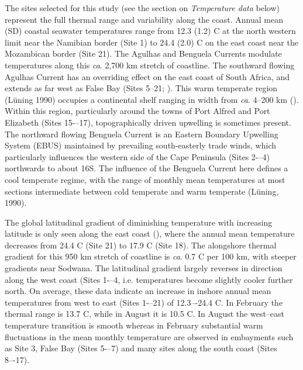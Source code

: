 \documentclass[a4paper,10pt,review]{elsarticle}
\begin{document}
The sites selected for this study (see the section on \emph{Temperature data} below) represent the full thermal range and variability along the coast. Annual mean (SD) coastal seawater temperatures range from 12.3 (1.2) \degree C at the north western limit near the Namibian border (Site 1) to 24.4 (2.0) \degree C on the east coast near the Mozambican border (Site 21). The Agulhas and Benguela Currents modulate temperatures along this \emph{ca}. 2,700 km stretch of coastline. The southward flowing Agulhas Current has an overriding effect on the east coast of South Africa, and extends as far west as False Bay (Sites 5--21; ). This warm temperate region (Lüning 1990) occupies a continental shelf ranging in width from \emph{ca}. 4--200 km (). Within this region, particularly around the towns of Port Alfred and Port Elizabeth (Sites 15-–17), topographically driven upwelling is sometimes present. The northward flowing Benguela Current is an Eastern Boundary Upwelling System (EBUS) maintained by prevailing south-easterly trade winds, which particularly influences the western side of the Cape Peninsula (Sites 2-–4) northwards to about 16\degree S. The inﬂuence of the Benguela Current here deﬁnes a cool temperate regime, with the range of monthly mean temperatures at most sections intermediate between cold temperate and warm temperate (Lüning, 1990).

The global latitudinal gradient of diminishing temperature with increasing latitude is only seen along the east coast (), where the annual mean temperature decreases from 24.4 \degree C (Site 21) to 17.9 \degree C (Site 18). The alongshore thermal gradient for this 950 km stretch of coastline is \emph{ca}. 0.7 \degree C per 100 km, with steeper gradients near Sodwana. The latitudinal gradient largely reverses in direction along the west coast (Sites 1-–4, i.e. temperatures become slightly cooler further north. On average, these data indicate an increase in inshore annual mean temperatures from west to east (Sites 1-–21) of 12.3–-24.4 \degree C. In February the thermal range is 13.7 \degree C, while in August it is 10.5 \degree C. In August the west–east temperature transition is smooth whereas in February substantial warm ﬂuctuations in the mean monthly temperature are observed in embayments such as Site 3, False Bay (Sites 5-–7) and many sites along the south coast (Sites 8–-17).
\end{document}
